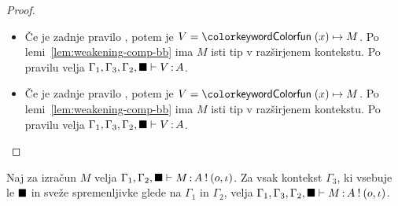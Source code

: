 \begin{proof}
\begin{itemize}
		\item Če je zadnje pravilo , potem je $V = \tmfun{x}{M}$.
		Po lemi~\ref{lem:weakening-comp-bb} ima $M$ isti tip v razširjenem kontekstu.
		Po pravilu  velja $\Gamma_1, \Gamma_3, \Gamma_2, \blacksquare \vdash V \mathinner{:} A$.
		
		\item Če je zadnje pravilo , potem je $V = \tmfun{x}{M}$.
		Po lemi~\ref{lem:weakening-comp-bb} ima $M$ isti tip v razširjenem kontekstu.
		Po pravilu  velja $\Gamma_1, \Gamma_3, \Gamma_2, \blacksquare \vdash V \mathinner{:} A$.
		
	\end{itemize}
\end{proof}

\begin{lema}\label{lem:weakening-comp-bb}
	Naj za izračun $M$ velja $\Gamma_1, \Gamma_2, \blacksquare \vdash M \mathinner{:} A \mathbin{!} (o, \iota)$.
	Za vsak kontekst $\Gamma_3$, ki vsebuje le $\blacksquare$ in sveže spremenljivke glede na $\Gamma_1$ in $\Gamma_2$, velja $\Gamma_1, \Gamma_3, \Gamma_2, \blacksquare \vdash M \mathinner{:} A \mathbin{!} (o, \iota)$.
\end{lema}

